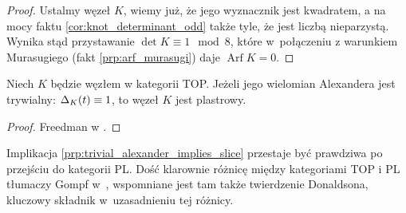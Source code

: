 \begin{proof}
    Ustalmy węzeł $K$, wiemy już, że jego wyznacznik jest kwadratem, a na mocy faktu \ref{cor:knot_determinant_odd} także tyle, że jest liczbą nieparzystą.
    Wynika stąd przystawanie $\det K \equiv 1 \mod 8$, które w~połączeniu z warunkiem Murasugiego (fakt \ref{prp:arf_murasugi}) daje $\operatorname{Arf} K = 0$.
\end{proof}

\begin{proposition}
    \label{prp:trivial_alexander_implies_slice}
    Niech $K$ będzie węzłem w kategorii TOP.
    Jeżeli jego wielomian Alexandera jest trywialny: $\Delta_K(t) \equiv 1$, to węzeł $K$ jest plastrowy.
\end{proposition}

\begin{proof}
    Freedman w \cite[tw. 1.13]{freedman82}.
\end{proof}

Implikacja \ref{prp:trivial_alexander_implies_slice} przestaje być prawdziwa po przejściu do kategorii PL.
Dość klarownie różnicę między kategoriami TOP i PL tłumaczy Gompf w~\cite{gompf86}, wspomniane jest tam także twierdzenie Donaldsona, kluczowy składnik w~uzasadnieniu tej różnicy.






